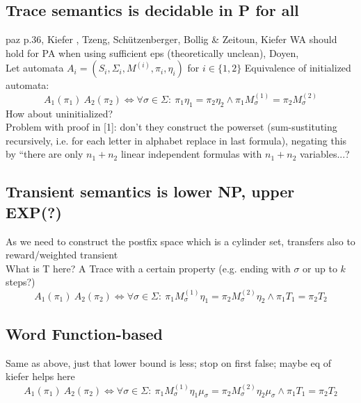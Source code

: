         \subsection{Trace semantics is decidable in P for all}
                paz p.36, Kiefer  , Tzeng, Schützenberger, Bollig \& Zeitoun, Kiefer WA should hold for PA when using sufficient eps (theoretically unclean), Doyen, \\
                Let automata $A_i = \left( S_i, \Sigma_i, M^{(i)}, \pi_i, \eta_i \right)$ for $i \in \{1, 2\}$
                Equivalence of initialized automata:
                \[ A_1(\pi_1) ~ A_2(\pi_2) \Leftrightarrow \forall \sigma \in \Sigma: \ \pi_1 \eta_1 = \pi_2 \eta_2 \wedge \pi_1 M^{(1)}_{\sigma} = \pi_2 M^{(2)}_{\sigma}  \]
                How about uninitialized? \\
                
                Problem with proof in [1]: don't they construct the powerset (sum-sustituting recursively, i.e. for each letter in alphabet replace in last formula), negating this by ``there are only $n_1+n_2$ linear independent formulas with $n_1+n_2$ variables...?
                
        \subsection{Transient semantics is lower NP, upper EXP(?)}
            As we need to construct the postfix space which is a cylinder set, transfers also to reward/weighted transient \\
            
            What is T here? A Trace with a certain property (e.g. ending with $\sigma$ or up to $k$ steps?)
            \[ A_1(\pi_1) ~ A_2(\pi_2) \Leftrightarrow \forall \sigma \in \Sigma: \ \pi_1 M^{(1)}_{\sigma} \eta_1 = \pi_2 M^{(2)}_{\sigma} \eta_2 \wedge \pi_1 T_1 = \pi_2  T_2 \]
            
        \subsection{Word Function-based}
            Same as above, just that lower bound is less; stop on first false; maybe eq of kiefer helps here
            \[ A_1(\pi_1) ~ A_2(\pi_2) \Leftrightarrow \forall \sigma \in \Sigma: \ \pi_1 M^{(1)}_{\sigma} \eta_1 \mu_{\sigma} = \pi_2 M^{(2)}_{\sigma} \eta_2 \mu_{\sigma} \wedge \pi_1 T_1 = \pi_2  T_2 \]    
        
            
     
